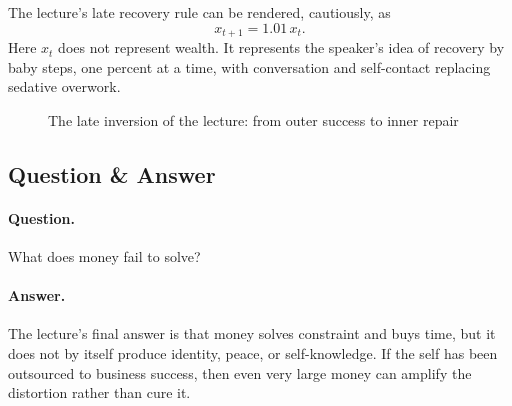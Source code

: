 The lecture's late recovery rule can be rendered, cautiously, as
\begin{equation}
x_{t+1}=1.01\,x_t.
\end{equation}
Here \(x_t\) does not represent wealth. It represents the speaker's idea of recovery by baby steps, one percent at a time, with conversation and self-contact replacing sedative overwork.

\begin{figure}[h]
\centering
{}
\caption{The late inversion of the lecture: from outer success to inner repair}
\end{figure}

\subsection{Question \& Answer}

\paragraph{Question.} What does money fail to solve?

\paragraph{Answer.} The lecture's final answer is that money solves constraint and buys time, but it does not by itself produce identity, peace, or self-knowledge. If the self has been outsourced to business success, then even very large money can amplify the distortion rather than cure it.

